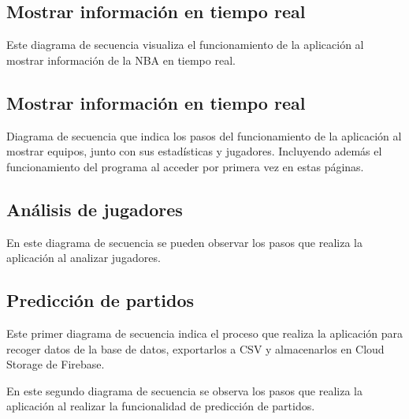 \clearpage

\subsection{Mostrar información en tiempo real}

\hfill

Este diagrama de secuencia visualiza el funcionamiento de la aplicación al mostrar información de la NBA en tiempo real.

\clearpage

\subsection{Mostrar información en tiempo real}

\hfill

Diagrama de secuencia que indica los pasos del funcionamiento de la aplicación al mostrar equipos, junto con sus estadísticas y jugadores. Incluyendo además el funcionamiento del programa al acceder por primera vez en estas páginas.

\clearpage

\subsection{Análisis de jugadores}

\hfill

En este diagrama de secuencia se pueden observar los pasos que realiza la aplicación al analizar jugadores.

\vfill

\subsection{Predicción de partidos}

\hfill

Este primer diagrama de secuencia indica el proceso que realiza la aplicación para recoger datos de la base de datos, exportarlos a CSV y almacenarlos en Cloud Storage de Firebase.

\hfill

En este segundo diagrama de secuencia se observa los pasos que realiza la aplicación al realizar la funcionalidad de predicción de partidos.

